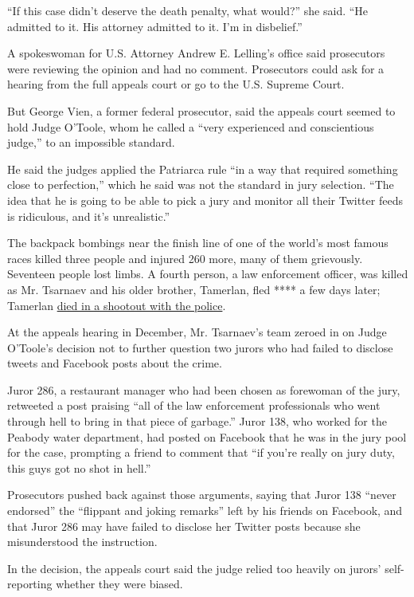 ``If this case didn't deserve the death penalty, what would?'' she said.
``He admitted to it. His attorney admitted to it. I'm in disbelief.''

A spokeswoman for U.S. Attorney Andrew E. Lelling's office said
prosecutors were reviewing the opinion and had no comment. Prosecutors
could ask for a hearing from the full appeals court or go to the U.S.
Supreme Court.

But George Vien, a former federal prosecutor, said the appeals court
seemed to hold Judge O'Toole, whom he called a ``very experienced and
conscientious judge,'' to an impossible standard.

He said the judges applied the Patriarca rule ``in a way that required
something close to perfection,'' which he said was not the standard in
jury selection. ``The idea that he is going to be able to pick a jury
and monitor all their Twitter feeds is ridiculous, and it's
unrealistic.''

The backpack bombings near the finish line of one of the world's most
famous races killed three people and injured 260 more, many of them
grievously. Seventeen people lost limbs. A fourth person, a law
enforcement officer, was killed as Mr. Tsarnaev and his older brother,
Tamerlan, fled **** a few days later; Tamerlan
\href{https://www.nytimes.com/2013/05/05/us/autopsy-says-boston-bombing-suspect-died-of-gunshot-wounds-and-blunt-trauma.html}{died
in a shootout with the police}.

At the appeals hearing in December, Mr. Tsarnaev's team zeroed in on
Judge O'Toole's decision not to further question two jurors who had
failed to disclose tweets and Facebook posts about the crime.

Juror 286, a restaurant manager who had been chosen as forewoman of the
jury, retweeted a post praising ``all of the law enforcement
professionals who went through hell to bring in that piece of garbage.''
Juror 138, who worked for the Peabody water department, had posted on
Facebook that he was in the jury pool for the case, prompting a friend
to comment that ``if you're really on jury duty, this guys got no shot
in hell.''

Prosecutors pushed back against those arguments, saying that Juror 138
``never endorsed'' the ``flippant and joking remarks'' left by his
friends on Facebook, and that Juror 286 may have failed to disclose her
Twitter posts because she misunderstood the instruction.

In the decision, the appeals court said the judge relied too heavily on
jurors' self-reporting whether they were biased.

